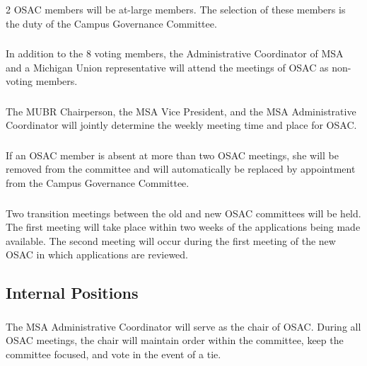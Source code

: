 \subsubsection{}
2 OSAC members will be at-large members.  The selection of these members is the duty of the Campus Governance Committee.

\subsubsection{}
In addition to the 8 voting members, the Administrative Coordinator of MSA and a Michigan Union representative will attend the meetings of OSAC as non-voting members.

\subsubsection{}
The MUBR Chairperson, the MSA Vice President, and the MSA Administrative Coordinator will jointly determine the weekly meeting time and place for OSAC.

\subsubsection{}
If an OSAC member is absent at more than two OSAC meetings, she will be removed from the committee and will automatically be replaced by appointment from the Campus Governance Committee.

\subsubsection{}
Two transition meetings between the old and new OSAC committees will be held.  The first meeting will take place within two weeks of the applications being made available.  The second meeting will occur during the first meeting of the new OSAC in which applications are reviewed.


\subsection{Internal Positions}

\subsubsection{}
The MSA Administrative Coordinator will serve as the chair of OSAC.  During all OSAC meetings, the chair will maintain order within the committee, keep the committee focused, and vote in the event of a tie.

